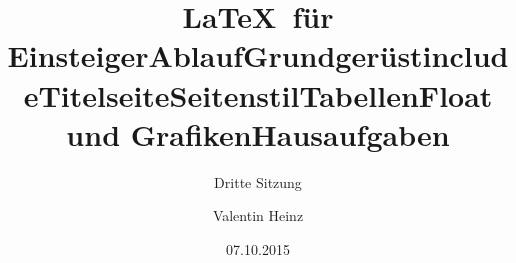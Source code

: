 \documentclass[]{beamer}
\date{}
\author{Valentin Heinz}
\title{\LaTeX \ für Einsteiger}
\date{07.10.2015}
\subtitle{Dritte Sitzung}
\begin{document}
\maketitle

\title{Ablauf}


\title{Grundgerüst}


\title{include}


\title{Titelseite}


\title{Seitenstil}


\title{Tabellen}


\title{Float und Grafiken}


\title{Hausaufgaben}


\end{document}
